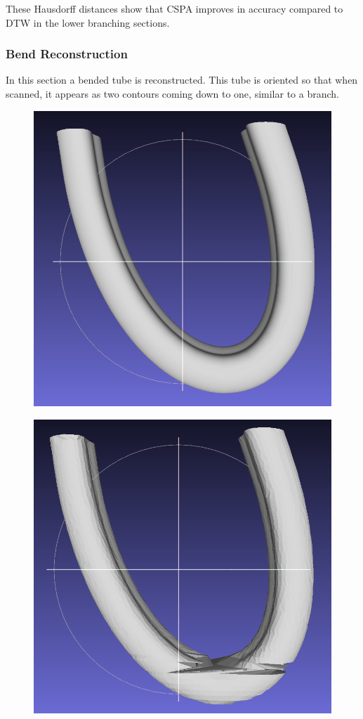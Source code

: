 \documentclass[11p, titlepage]{article}
\begin{document}
These Hausdorff distances show that CSPA improves in accuracy compared to DTW in the lower branching sections.

\subsubsection{Bend Reconstruction}

In this section a bended tube is reconstructed. This tube is oriented so that when scanned, it appears as two contours coming down to one, similar to a branch.

\begin{figure}[h]
     \centering
     \begin{minipage}[b]{.38\linewidth}
       {\includegraphics[width=\linewidth]{originals/bend}}%
     \end{minipage}%
     \hfill
     \begin{minipage}[b]{.6\linewidth}
       {\includegraphics[width=.48\linewidth]{reconstructions/dtw-bend-50}}%

\end{minipage}
\end{figure}
\end{document}
